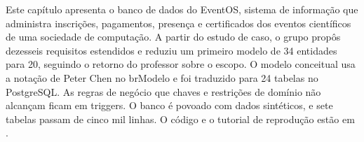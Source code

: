 \begin{abstract}
\begin{otherlanguage}{english}
This chapter presents the database of EventOS, an information system that manages registrations, payments, attendance and certificates for the scientific events of a computing society. Starting from the case study, the team proposed sixteen extended requirements and reduced a first model of 34 entities to 20, following the instructor's feedback on scope. The conceptual model uses Peter Chen's notation in brModelo and was translated into 24 PostgreSQL tables. Business rules that cannot be declared with keys and checks are enforced by triggers. The database is populated with synthetic data, and seven tables hold more than five thousand rows. Code and reproduction instructions are available at \repo.
\end{otherlanguage}
\end{abstract}

\begin{resumo}
Este capítulo apresenta o banco de dados do EventOS, sistema de informação que administra inscrições, pagamentos, presença e certificados dos eventos científicos de uma sociedade de computação. A partir do estudo de caso, o grupo propôs dezesseis requisitos estendidos e reduziu um primeiro modelo de 34 entidades para 20, seguindo o retorno do professor sobre o escopo. O modelo conceitual usa a notação de Peter Chen no brModelo e foi traduzido para 24 tabelas no PostgreSQL. As regras de negócio que chaves e restrições de domínio não alcançam ficam em triggers. O banco é povoado com dados sintéticos, e sete tabelas passam de cinco mil linhas. O código e o tutorial de reprodução estão em \repo.
\end{resumo}
